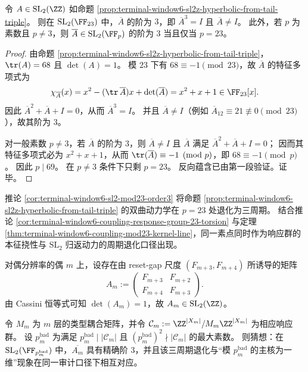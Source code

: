 \begin{corollary}\label{cor:terminal-window6-sl2-mod23-order3}
令 \(A\in\mathrm{SL}_2(\ZZ)\) 如命题 \ref{prop:terminal-window6-sl2z-hyperbolic-from-tail-triple}。
则在 \(\mathrm{SL}_2(\FF_{23})\) 中，\(\overline A\) 的阶为 \(3\)，即 \(\overline A^3=I\) 且 \(\overline A\neq I\)。
此外，若 \(p\) 为素数且 \(p\neq 3\)，则 \(\overline A\in\mathrm{SL}_2(\FF_p)\) 的阶为 \(3\) 当且仅当 \(p=23\)。
\end{corollary}
\begin{proof}
由命题 \ref{prop:terminal-window6-sl2z-hyperbolic-from-tail-triple}，
\(\tr(A)=68\) 且 \(\det(A)=1\)。
模 \(23\) 下有 \(68\equiv -1\pmod{23}\)，故 \(\overline A\) 的特征多项式为
\[
\chi_{\overline A}(x)=x^2-(\tr\,\overline A)x+\det(\overline A)=x^2+x+1\in\FF_{23}[x].
\]
因此 \(\overline A^2+\overline A+I=0\)，从而 \(\overline A^3=I\)。
并且 \(\overline A\neq I\)（例如 \(\overline A_{12}\equiv 21\not\equiv 0\pmod{23}\)），故其阶为 \(3\)。
\par
对一般素数 \(p\neq 3\)，若 \(\overline A\) 的阶为 \(3\)，则 \(\overline A\neq I\) 且 \(\overline A\) 满足 \(\overline A^2+\overline A+I=0\)；
因而其特征多项式必为 \(x^2+x+1\)，从而 \(\tr(\overline A)\equiv -1\pmod p\)，即 \(68\equiv -1\pmod p\)。
因此 \(p\mid 69\)。
在 \(p\neq 3\) 条件下只剩 \(p=23\)。
反向蕴含已由第一段验证。证毕。
\end{proof}

\begin{remark}\label{rem:terminal-window6-mod23-period3-collapse}
推论 \ref{cor:terminal-window6-sl2-mod23-order3} 将命题 \ref{prop:terminal-window6-sl2z-hyperbolic-from-tail-triple} 的双曲动力学在 \(p=23\) 处退化为三周期。
结合推论 \ref{cor:terminal-window6-coupling-response-group-23-torsion} 与定理 \ref{thm:terminal-window6-coupling-mod23-kernel-line}，同一素点同时作为响应群的本征挠性与 \(\mathrm{SL}_2\) 归返动力的周期退化口径出现。
\end{remark}

\begin{conjecture}\label{conj:windowm-badprime-fibsl2-order3}
对偶分辨率的偶 \(m\) 上，设存在由 reset-gap 尺度 \((F_{m+3},F_{m+4})\) 所诱导的矩阵
\[
A_m:=\begin{pmatrix}F_{m+3}&F_{m+2}\\F_{m+4}&F_{m+3}\end{pmatrix}.
\]
由 Cassini 恒等式可知 \(\det(A_m)=1\)，故 \(A_m\in \mathrm{SL}_2(\ZZ)\)。
\par
令 \(M_m\) 为 \(m\) 层的类型耦合矩阵，并令 \(\mathcal C_m:=\ZZ^{|X_m|}/M_m\ZZ^{|X_m|}\) 为相应响应群。
设 \(p_m^{\mathrm{bad}}\) 为满足
\(
p_m^{\mathrm{bad}}\mid |\mathcal C_m|
\)
且
\(
(p_m^{\mathrm{bad}})^2\nmid |\mathcal C_m|
\)
的最大素数。
则猜想：在 \(\mathrm{SL}_2(\FF_{p_m^{\mathrm{bad}}})\) 中，\(\overline{A_m}\) 具有精确阶 \(3\)，并且该三周期退化与“模 \(p_m^{\mathrm{bad}}\) 的主核为一维”现象在同一审计口径下相互对应。
\end{conjecture}
